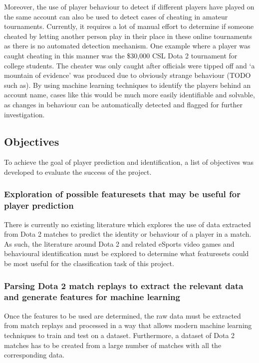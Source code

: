 \documentclass[Report.tex]{subfiles}
\begin{document}
Moreover, the use of player behaviour to detect if different players have played on the same account can also be used to detect cases of cheating in amateur tournaments. Currently, it requires a lot of manual effort to determine if someone cheated by letting another person play in their place in these online tournaments as there is no automated detection mechanism. One example where a player was caught cheating in this manner was the \$30,000 CSL Dota 2 tournament for college students. The cheater was only caught after officials were tipped off and `a mountain of evidence' was produced \cite{dota-cheating} due to obviously strange behaviour (TODO such as). By using machine learning techniques to identify the players behind an account name, cases like this would be much more easily identifiable and solvable, as changes in behaviour can be automatically detected and flagged for further investigation. 

\subsection{Objectives}
To achieve the goal of player prediction and identification, a list of objectives was developed to evaluate the success of the project. 

\subsubsection{Exploration of possible featuresets that may be useful for player prediction}
There is currently no existing literature which explores the use of data extracted from Dota 2 matches to predict the identity or behaviour of a player in a match. As such, the literature around Dota 2 and related eSports video games and behavioural identification must be explored to determine what featuresets could be most useful for the classification task of this project. 

\subsubsection{Parsing Dota 2 match replays to extract the relevant data and generate features for machine learning}
Once the features to be used are determined, the raw data must be extracted from match replays and processed in a way that allows modern machine learning techniques to train and test on a dataset. Furthermore, a dataset of Dota 2 matches has to be created from a large number of matches with all the corresponding data. 
\end{document}
